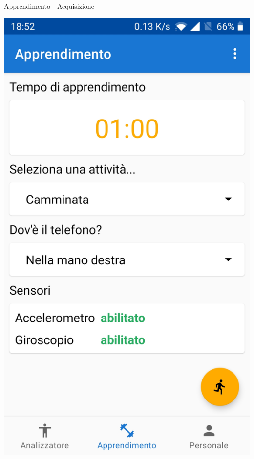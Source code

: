 \begin{tframe}{Apprendimento - Acquisizione}
\begin{minipage}{0.35\textwidth}
        \centering\includegraphics[scale = 0.09]{assets/images/screenshots/apprendimento.jpg}        

    \end{minipage}%

\end{tframe}